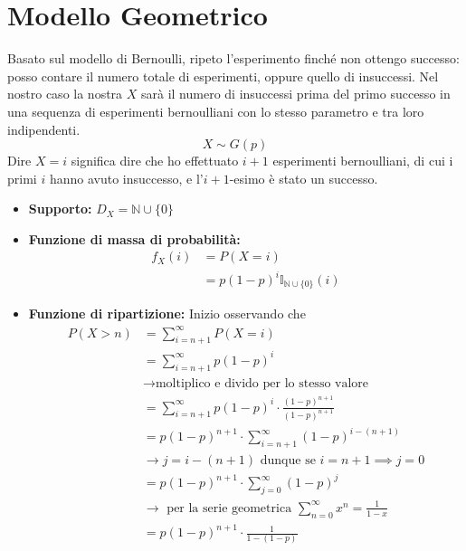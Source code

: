 \documentclass[11pt]{report}
\begin{document}
\section{Modello Geometrico}
Basato sul modello di Bernoulli, ripeto l'esperimento finché non ottengo successo: posso contare il numero totale di esperimenti, oppure quello di insuccessi. Nel nostro caso la nostra $X$ sarà il numero di insuccessi prima del primo successo in una sequenza di esperimenti bernoulliani con lo stesso parametro e tra loro indipendenti.
\begin{equation}
    X\sim G(p)
\end{equation}
Dire $X=i$ significa dire che ho effettuato $i+1$ esperimenti bernoulliani, di cui i primi $i$ hanno avuto insuccesso, e l'$i+1$-esimo è stato un successo.
\begin{itemize}
    \item \textbf{Supporto:} $D_X=\mathbb{N} \cup \{0\}$
    \item \textbf{Funzione di massa di probabilità:}
    \begin{equation}
        \begin{split}
            f_X(i) & = P(X=i)\\
            & = p(1-p)^i \mathbb{I}_{\mathbb{N}\cup\{0\}}(i)
        \end{split}
    \end{equation}
    \item \textbf{Funzione di ripartizione:} Inizio osservando che
    \begin{equation}
    	\begin{split}
   			P(X > n) & = \sum_{i=n+1}^\infty P(X=i)\\
            & = \sum_{i=n+1}^\infty p(1-p)^i\\
            & \rightarrow \text{moltiplico e divido per lo stesso valore}\\
            & = \sum_{i=n+1}^\infty p(1-p)^i \cdot \frac{(1-p)^{n+1}}{(1-p)^{n+1}}\\
            & = p(1-p)^{n+1} \cdot \sum_{i=n+1}^\infty (1-p)^{i - (n+1)}\\
            & \rightarrow j = i - (n+1) \text{ dunque se } i=n+1 \implies j=0\\
            & = p(1-p)^{n+1} \cdot \sum_{j=0}^\infty (1-p)^j\\
            & \rightarrow \text{ per la serie geometrica } \sum_{n=0}^\infty x^n = \frac{1}{1-x}\\
            & = p(1-p)^{n+1} \cdot \frac{1}{1-(1-p)}\\

\end{split}
\end{equation}
\end{itemize}
\end{document}
